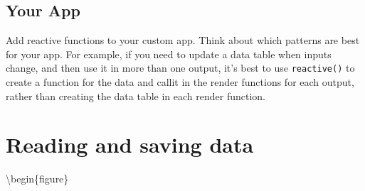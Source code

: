 \documentclass[
  oneside]{book}
\newenvironment{Shaded}{\begin{snugshade}}{\end{snugshade}}
\newcommand{\AttributeTok}[1]{\textcolor[rgb]{0.77,0.63,0.00}{#1}}
\newcommand{\ConstantTok}[1]{\textcolor[rgb]{0.00,0.00,0.00}{#1}}
\newcommand{\ControlFlowTok}[1]{\textcolor[rgb]{0.13,0.29,0.53}{\textbf{#1}}}
\newcommand{\FunctionTok}[1]{\textcolor[rgb]{0.00,0.00,0.00}{#1}}
\newcommand{\NormalTok}[1]{#1}
\newcommand{\OtherTok}[1]{\textcolor[rgb]{0.56,0.35,0.01}{#1}}
\newcommand{\SpecialCharTok}[1]{\textcolor[rgb]{0.00,0.00,0.00}{#1}}
\newcommand{\StringTok}[1]{\textcolor[rgb]{0.31,0.60,0.02}{#1}}
\begin{document}
\begin{Shaded}
\end{Shaded}

\hypertarget{your-app-reactive}{%
\section{Your App}\label{your-app-reactive}}

Add reactive functions to your custom app. Think about which patterns are best for your app. For example, if you need to update a data table when inputs change, and then use it in more than one output, it's best to use \texttt{reactive}\texttt{()} to create a function for the data and callit in the render functions for each output, rather than creating the data table in each render function.

\hypertarget{data}{%
\chapter{Reading and saving data}\label{data}}

\textbackslash begin\{figure\}
\end{document}
